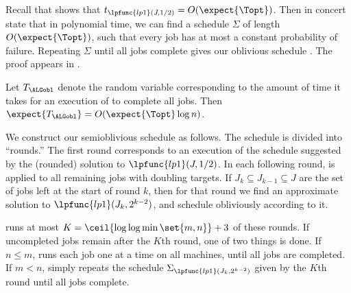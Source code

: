 Recall that  shows that $t_{\lpfunc{lp1}(J,1/2)} =
O(\expect{\Topt})$.  Then  in concert state
that in polynomial time, we can find a schedule $\Sigma$ of length
$O(\expect{ \Topt })$, such that every job has at most a constant
probability of failure. Repeating $\Sigma$ until all jobs complete
gives our oblivious schedule \ALGobl.  The proof appears in .
\newcommand{\indboundthm}{
\begin{theorem}\thmlabel{indbound}
  Let $T_{\ALGobl}$ denote the random variable corresponding to the
  amount of time it takes for an execution of \ALGobl to complete all
  jobs.  Then $\expect{T_{\ALGobl}} = O(\expect{\Topt} \log n)$.
\end{theorem}
}
\indboundthm
\newcommand{\indboundproof}{
\begin{proof}
  From \lemreftwo{lplower}{lp1rounding}, we have a schedule $\Sigma$
  of length $O(\expect{ \Topt } )$ that gives each job a constant
  probability of success.  Applying a Chernoff bound gives us that a
  particular job completes in $O(\log n)$ repetitions of $\Sigma$,
  with probability at least $1-1/n^{\Theta(1)}$, where the constant
  exponent appears as a constant factor in the number of repetitions.
  Taking a union bound over all jobs gives that with probability at
  least $1-1/n^{\Theta(1)}$, \emph{all} jobs complete in $O(\log n)$
  repetitions.  Since this probability drops off dramatically as the
  number of repetitions increases, we have $\expect{T_{\ALGobl}} =
  O(\expect{\Topt}\log n)$.
\end{proof}
}\vspace{-.5em}

We construct our semioblivious schedule \ALGsem as follows.  The
schedule is divided into ``rounds.''  The first round corresponds to
an execution of the schedule suggested by the (rounded) solution
to $\lpfunc{lp1}(J,1/2)$.  In each following round,  is
applied to all remaining jobs with doubling targets.  If  
$J_k \subseteq J_{k-1}\subseteq J$ are the set of jobs left at
the start of round $k$,  then for that round we find an approximate solution 
to $\lpfunc{lp1}(J_k,2^{k-2})$, and schedule obliviously according to it.

\ALGsem runs at most $K = \ceil{\log\log \min \set{m,n}}+3$ of these
rounds. If uncompleted jobs remain after the $K$th round,
one of two things is done.  If $n \leq m$, \ALGsem runs each job one at a time
on all machines, until all jobs are completed. If $m < n$, \ALGsem
simply repeats the schedule $\Sigma_{\lpfunc{lp1}(J_k,2^{k-2})}$ given
by the $K$th round until all jobs complete.

